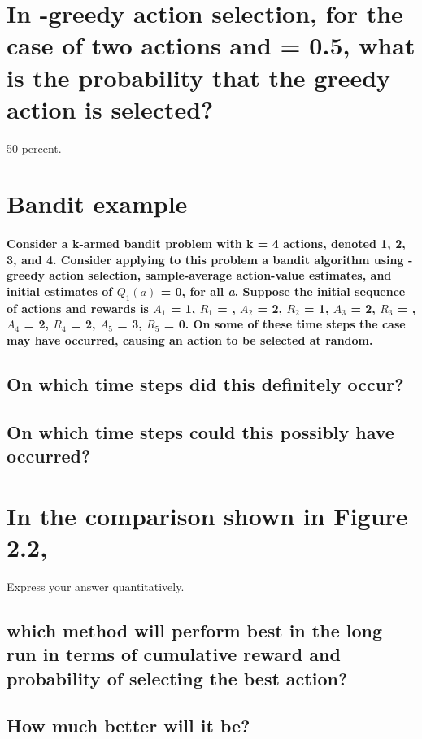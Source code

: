 \documentclass{article}
\begin{document}
\maketitle

\section{In \textepsilon-greedy action selection, for the case of two actions and \textepsilon \thickspace = 0.5, what is the probability that the greedy action is selected?}
50 percent.

\section{Bandit example}
\paragraph{Consider a k-armed bandit problem with k = 4 actions, denoted 1, 2, 3, and 4. 
           Consider applying to this problem a bandit algorithm using \textepsilon-greedy action selection, 
           sample-average action-value estimates, and initial estimates of $ Q_1(a) $ = 0, for all \emph{a}. Suppose the initial sequence of actions and rewards is $A_1$ = 1, $R_1$ = , $A_2$ = 2, $R_2$ = 1, $A_3$ = 2, $R_3$ = , $A_4$ = 2, $R_4$ = 2, $A_5$ = 3, $R_5$ = 0. On some of these time steps the \textepsilon \thickspace case may have occurred, causing an action to be selected at random.}
\subsection{On which time steps did this definitely occur?}
\subsection{On which time steps could this possibly have occurred?}

\section{In the comparison shown in Figure 2.2, }
Express your answer quantitatively.
\subsection{which method will perform best in the long run in terms of cumulative reward and probability of selecting the best action?}
\subsection{How much better will it be?}
\end{document}
